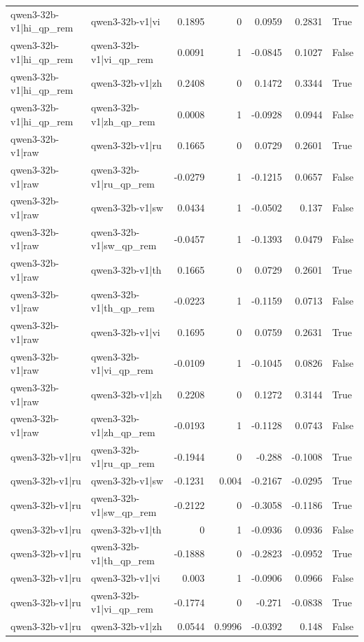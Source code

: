 \begin{table}
\begin{tabular}{l l r r r r l}
qwen3-32b-v1|hi_qp_rem & qwen3-32b-v1|vi & 0.1895 & 0 & 0.0959 & 0.2831 & True \\
qwen3-32b-v1|hi_qp_rem & qwen3-32b-v1|vi_qp_rem & 0.0091 & 1 & -0.0845 & 0.1027 & False \\
qwen3-32b-v1|hi_qp_rem & qwen3-32b-v1|zh & 0.2408 & 0 & 0.1472 & 0.3344 & True \\
qwen3-32b-v1|hi_qp_rem & qwen3-32b-v1|zh_qp_rem & 0.0008 & 1 & -0.0928 & 0.0944 & False \\
qwen3-32b-v1|raw & qwen3-32b-v1|ru & 0.1665 & 0 & 0.0729 & 0.2601 & True \\
qwen3-32b-v1|raw & qwen3-32b-v1|ru_qp_rem & -0.0279 & 1 & -0.1215 & 0.0657 & False \\
qwen3-32b-v1|raw & qwen3-32b-v1|sw & 0.0434 & 1 & -0.0502 & 0.137 & False \\
qwen3-32b-v1|raw & qwen3-32b-v1|sw_qp_rem & -0.0457 & 1 & -0.1393 & 0.0479 & False \\
qwen3-32b-v1|raw & qwen3-32b-v1|th & 0.1665 & 0 & 0.0729 & 0.2601 & True \\
qwen3-32b-v1|raw & qwen3-32b-v1|th_qp_rem & -0.0223 & 1 & -0.1159 & 0.0713 & False \\
qwen3-32b-v1|raw & qwen3-32b-v1|vi & 0.1695 & 0 & 0.0759 & 0.2631 & True \\
qwen3-32b-v1|raw & qwen3-32b-v1|vi_qp_rem & -0.0109 & 1 & -0.1045 & 0.0826 & False \\
qwen3-32b-v1|raw & qwen3-32b-v1|zh & 0.2208 & 0 & 0.1272 & 0.3144 & True \\
qwen3-32b-v1|raw & qwen3-32b-v1|zh_qp_rem & -0.0193 & 1 & -0.1128 & 0.0743 & False \\
qwen3-32b-v1|ru & qwen3-32b-v1|ru_qp_rem & -0.1944 & 0 & -0.288 & -0.1008 & True \\
qwen3-32b-v1|ru & qwen3-32b-v1|sw & -0.1231 & 0.004 & -0.2167 & -0.0295 & True \\
qwen3-32b-v1|ru & qwen3-32b-v1|sw_qp_rem & -0.2122 & 0 & -0.3058 & -0.1186 & True \\
qwen3-32b-v1|ru & qwen3-32b-v1|th & 0 & 1 & -0.0936 & 0.0936 & False \\
qwen3-32b-v1|ru & qwen3-32b-v1|th_qp_rem & -0.1888 & 0 & -0.2823 & -0.0952 & True \\
qwen3-32b-v1|ru & qwen3-32b-v1|vi & 0.003 & 1 & -0.0906 & 0.0966 & False \\
qwen3-32b-v1|ru & qwen3-32b-v1|vi_qp_rem & -0.1774 & 0 & -0.271 & -0.0838 & True \\
qwen3-32b-v1|ru & qwen3-32b-v1|zh & 0.0544 & 0.9996 & -0.0392 & 0.148 & False \\

\end{tabular}
\end{table}

